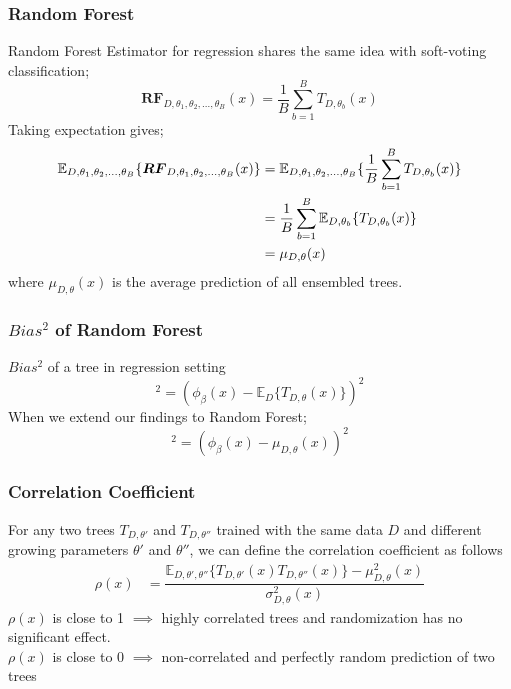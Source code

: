 \begin{frame}
    \frametitle{Random Forest}
    Random Forest Estimator for regression shares the same idea with soft-voting classification;
    \begin{equation}
        \boldsymbol{RF}_{D, \theta_{1},\theta_{2},..., \theta_{B}}(x) = \dfrac{1}{B}\sum_{b = 1}^{B}T_{D,\theta_{b}}(x)
    \end{equation}
    Taking expectation gives;
    \begin{align}
        \mathbb{E}_{D, \theta_{1}, \theta_{2},..., \theta_{B}}\{\boldsymbol{RF}_{D, \theta_{1},\theta_{2},..., \theta_{B}}(x) \} 
        & = \mathbb{E}_{D, \theta_{1}, \theta_{2},..., \theta_{B}}\{\dfrac{1}{B}\sum_{b = 1}^{B}T_{D,\theta_{b}}(x)\} \notag \\
        & = \dfrac{1}{B}\sum_{b=1}^{B}\mathbb{E}_{D,\theta_{b}}\{T_{D, \theta_{b}}(x)\}\notag \\
        & = \mu_{D,\theta}(x)
    \end{align}
    where $\mu_{D,\theta}(x)$ is the average prediction of all ensembled trees.
\end{frame}
\begin{frame}
    \frametitle{$Bias^2$ of Random Forest}
    $Bias^2$ of a tree in regression setting
    \begin{equation}
        [bias(T_{D,\theta})(x)]^2 = (\phi_{\beta}(x) - \mathbb{E}_{D}\{T_{D,\theta}(x)\})^2
    \end{equation}
    When we extend our findings to Random Forest;
    \begin{equation}
        [bias(\boldsymbol{RF}_{D,\theta})(x)]^2 = (\phi_{\beta}(x) - \mu_{D,\theta}(x))^2
    \end{equation}
\end{frame}
\begin{frame}
    \frametitle{Correlation Coefficient}
    For any two trees $T_{D,\theta'}$ and $T_{D,\theta''}$ trained with the same data $D$
    and different growing parameters $\theta'$ and $\theta''$, we can define the correlation coefficient as follows
    \begin{align}
        \rho(x) & 
        = \dfrac{\mathbb{E}_{D,\theta',\theta''}\{T_{D,\theta'}(x) T_{D,\theta''}(x)\} 
        - \mu_{D,\theta}^2(x)}{\sigma_{D,\theta}^2(x)}
    \end{align}
    $\rho(x)$ is close to 1 $\implies$ highly correlated trees and randomization has no significant effect. \\
    $\rho(x)$ is close to 0 $\implies$ non-correlated and perfectly random prediction of two trees
\end{frame}

